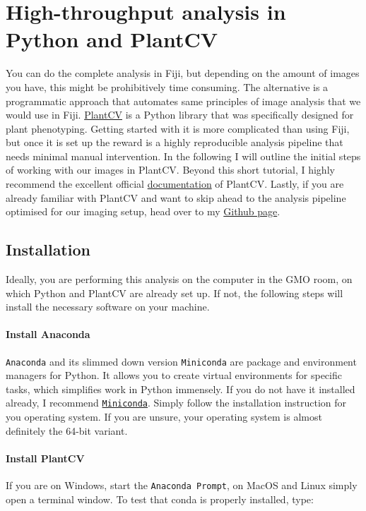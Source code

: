 \documentclass[10pt]{article}
\begin{document}
\section{High-throughput analysis in Python and PlantCV}

You can do the complete analysis in Fiji, but depending on the amount of images you have, this might be prohibitively time consuming. The alternative is a programmatic approach that automates same principles of image analysis that we would use in Fiji. \href{https://plantcv.danforthcenter.org/}{PlantCV} is a Python library that was specifically designed for plant phenotyping. Getting started with it is more complicated than using Fiji, but once it is set up the reward is a highly reproducible analysis pipeline that needs minimal manual intervention. In the following I will outline the initial steps of working with our images in PlantCV. Beyond this short tutorial, I highly recommend the excellent official \href{https://plantcv.readthedocs.io/en/stable/}{documentation} of PlantCV. Lastly, if you are already familiar with PlantCV and want to skip ahead to the analysis pipeline optimised for our imaging setup, head over to my \href{https://github.com/leonardblaschek/plantcv}{Github page}.

\subsection{Installation}

Ideally, you are performing this analysis on the computer in the GMO room, on which Python and PlantCV are already set up. If not, the following steps will install the necessary software on your machine.

\paragraph{Install Anaconda}
\texttt{Anaconda} and its slimmed down version \texttt{Miniconda} are package and environment managers for Python. It allows you to create virtual environments for specific tasks, which simplifies work in Python immensely. If you do not have it installed already, I recommend \href{https://docs.conda.io/en/latest/miniconda.html}{\texttt{Miniconda}}. Simply follow the installation instruction for you operating system. If you are unsure, your operating system is almost definitely the 64-bit variant.

\paragraph{Install PlantCV}
If you are on Windows, start the \texttt{Anaconda Prompt}, on MacOS and Linux simply open a terminal window. To test that conda is properly installed, type:
  
\end{document}

